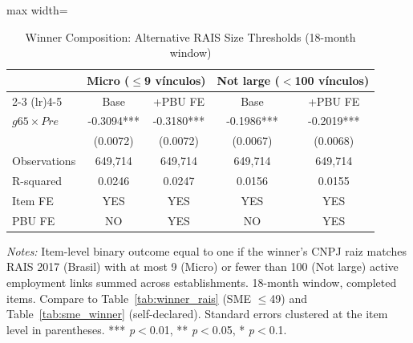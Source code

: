 \begin{table}[htbp]
\centering
\caption{Winner Composition: Alternative RAIS Size Thresholds (18-month window)}
\label{tab:winner_rais_alt}
\begin{adjustbox}{max width=\textwidth}
\begin{threeparttable}
\small
\begin{tabular}{lcccc}
\toprule
 & \multicolumn{2}{c}{Micro ($\leq$9 vínculos)} & \multicolumn{2}{c}{Not large ($<$100 vínculos)} \\
\cmidrule(lr){2-3} \cmidrule(lr){4-5}
 & Base & +PBU FE & Base & +PBU FE \\
\midrule
$g65 \times Pre$ & -0.3094*** & -0.3180*** & -0.1986*** & -0.2019*** \\
 & (0.0072) & (0.0072) & (0.0067) & (0.0068) \\
\midrule
Observations & 649,714 & 649,714 & 649,714 & 649,714 \\
R-squared & 0.0246 & 0.0247 & 0.0156 & 0.0155 \\
Item FE & YES & YES & YES & YES \\
PBU FE & NO & YES & NO & YES \\
\bottomrule
\end{tabular}
\begin{tablenotes}
\small
\item \textit{Notes:} Item-level binary outcome equal to one if the winner's
CNPJ raiz matches RAIS 2017 (Brasil) with at most 9 (Micro) or fewer than 100
(Not large) active employment links summed across establishments. 18-month window,
completed items. Compare to Table~\ref{tab:winner_rais} (SME $\leq$49) and
Table~\ref{tab:sme_winner} (self-declared).
Standard errors clustered at the item level in parentheses.
*** \textit{p}$<$0.01, ** \textit{p}$<$0.05, * \textit{p}$<$0.1.
\end{tablenotes}
\end{threeparttable}
\end{adjustbox}
\end{table}
